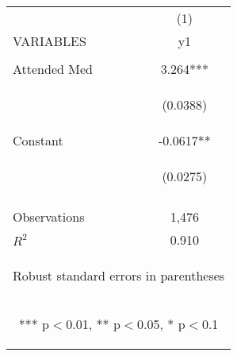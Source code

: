 \begin{center}
\begin{tabular}{lc} \hline
 & (1) \\
VARIABLES & y1 \\ \hline
\vspace{4pt} & \begin{footnotesize}\end{footnotesize} \\
Attended Med & 3.264*** \\
\vspace{4pt} & \begin{footnotesize}(0.0388)\end{footnotesize} \\
Constant & -0.0617** \\
 & \begin{footnotesize}(0.0275)\end{footnotesize} \\
\vspace{4pt} & \begin{footnotesize}\end{footnotesize} \\
Observations & 1,476 \\
 $R^2$ & 0.910 \\ \hline
\multicolumn{2}{c}{\begin{footnotesize} Robust standard errors in parentheses\end{footnotesize}} \\
\multicolumn{2}{c}{\begin{footnotesize} *** p$<$0.01, ** p$<$0.05, * p$<$0.1\end{footnotesize}} \\
\end{tabular}
\end{center}
